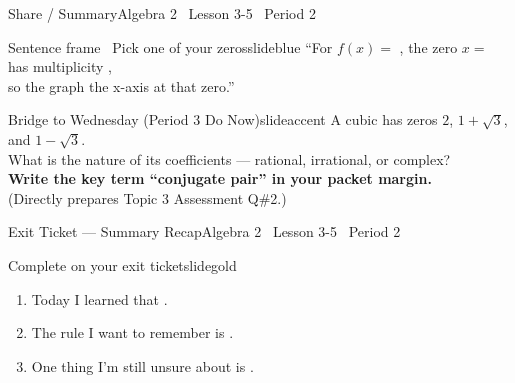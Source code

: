 \documentclass[aspectratio=169, 11pt]{beamer}
\begin{document}
\begin{frame}{Share / Summary}{Algebra 2 \textperiodcentered\ Lesson 3-5 \textperiodcentered\ Period 2}
\vspace{0.2cm}
\begin{projcard}{Sentence frame \textperiodcentered\ Pick one of your zeros}{slideblue}
``For \(f(x) = \) \underline{\hspace{2cm}}, the zero \(x = \) \underline{\hspace{1cm}}
has multiplicity \underline{\hspace{0.8cm}},\\
so the graph \underline{\hspace{2.2cm}} the x-axis at that zero.''
\end{projcard}

\vspace{0.15cm}
\begin{projcard}{Bridge to Wednesday (Period 3 Do Now)}{slideaccent}
A cubic has zeros \(2\), \(1+\sqrt{3}\), and \(1-\sqrt{3}\).\\
What is the nature of its coefficients --- rational, irrational, or complex?\\
\textcolor{slideaccent}{\textbf{Write the key term ``conjugate pair'' in your packet margin.}}\\
\small(Directly prepares Topic 3 Assessment Q\#2.)
\end{projcard}
\end{frame}

\begin{frame}{Exit Ticket --- Summary Recap}{Algebra 2 \textperiodcentered\ Lesson 3-5 \textperiodcentered\ Period 2}
\vspace{0.2cm}
\begin{projcard}{Complete on your exit ticket}{slidegold}
\begin{enumerate}
  \setlength{\itemsep}{0.2cm}
  \item Today I learned that \underline{\hspace{6cm}}.
  \item The rule I want to remember is \underline{\hspace{5cm}}.
  \item One thing I'm still unsure about is \underline{\hspace{4.5cm}}.
\end{enumerate}
\end{projcard}
\end{frame}
\end{document}
